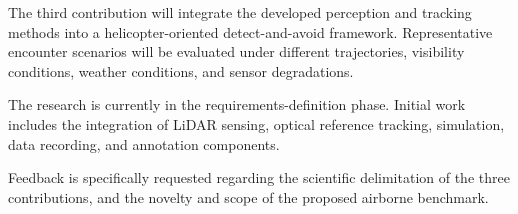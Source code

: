 The third contribution will integrate the developed perception and tracking methods into a helicopter-oriented detect-and-avoid framework. Representative encounter scenarios will be evaluated under different trajectories, visibility conditions, weather conditions, and sensor degradations. 

The research is currently in the requirements-definition phase. Initial work includes the integration of LiDAR sensing, optical reference tracking, simulation, data recording, and annotation components.

Feedback is specifically requested regarding the scientific delimitation of the three contributions, and the novelty and scope of the proposed airborne benchmark.

